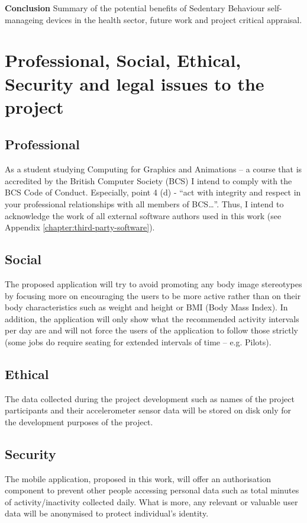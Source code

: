     
    \textbf{Conclusion} Summary of the potential benefits of Sedentary Behaviour self-manageing devices in the health sector, future work and project critical appraisal.\newline
    
    
    \section{Professional, Social, Ethical, Security and legal issues to the project}
    
    \subsection{Professional}
    As a student studying Computing for Graphics and Animations – a course that is accredited by the British Computer Society (BCS) I intend to comply with the BCS Code of Conduct. Especially, point 4 (d) \citep{bcs_2017} - “act with integrity and respect in your professional relationships with all members of BCS…”. Thus, I intend to acknowledge the work of all external software authors used in this work (see Appendix \ref{chapter:third-party-software}).

    \subsection{Social}
    The proposed application will try to avoid promoting any body image stereotypes by focusing more on encouraging the users to be more active rather than on their body characteristics such as weight and height or BMI (Body Mass Index). In addition, the application will only show what the recommended activity intervals per day are and will not force the users of the application to follow those strictly (some jobs do require seating for extended intervals of time – e.g. Pilots).
    
    \subsection{Ethical}
    The data collected during the project development such as names of the project participants and their accelerometer sensor data will be stored on disk only for the development purposes of the project. 
    
    \subsection{Security}
    The mobile application, proposed in this work, will offer an authorisation component to prevent other people accessing personal data such as total minutes of activity/inactivity collected daily. What is more, any relevant or valuable user data will be anonymised to protect individual’s identity.

